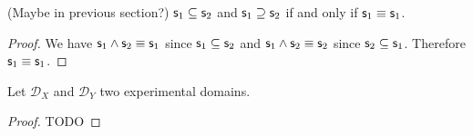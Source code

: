\documentclass[11pt,letterpaper,fleqn]{memoir} %
\begin{document}
\begin{mathSection}
	\begin{prop}
		(Maybe in previous section?) $\mathsf{s}_1 \subseteq \mathsf{s}_2$ and $\mathsf{s}_1 \supseteq \mathsf{s}_2$ if and only if $\mathsf{s}_1 \equiv \mathsf{s}_1$.
	\end{prop}
	
	\begin{proof}
		We have $\mathsf{s}_1 \wedge \mathsf{s}_2 \equiv \mathsf{s}_1$ since $\mathsf{s}_1 \subseteq \mathsf{s}_2$ and $\mathsf{s}_1 \wedge \mathsf{s}_2 \equiv \mathsf{s}_2$ since $\mathsf{s}_2 \subseteq \mathsf{s}_1$. Therefore $\mathsf{s}_1 \equiv \mathsf{s}_1$.
	\end{proof}	
\end{mathSection}

\begin{mathSection}
	\begin{defn}
		Let $\mathcal{D}_X$ and $\mathcal{D}_Y$ two experimental domains.
	\end{defn}
	\begin{prop}
		
	\end{prop}
	\begin{proof}
		TODO
	\end{proof}
\end{mathSection}
\end{document}
